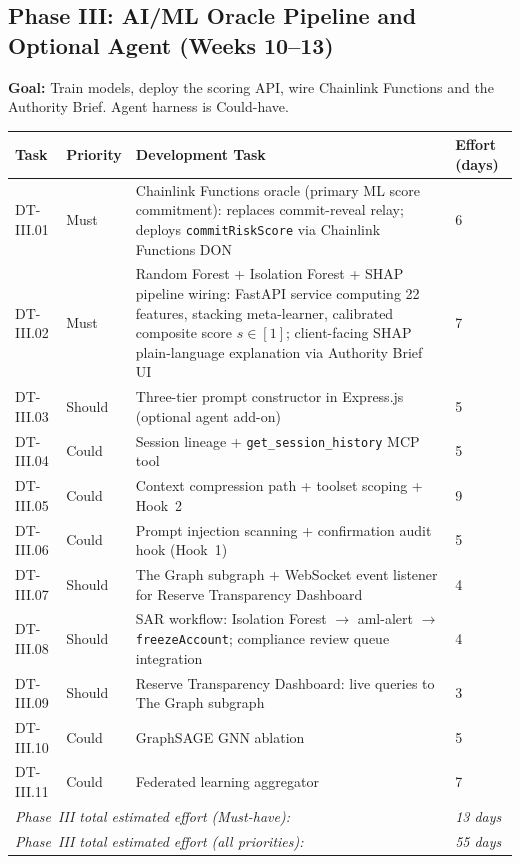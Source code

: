 \documentclass[12pt, a4paper]{report}
\newcommand{\tableheadcolor}{\rowcolor{TableHeadBg}}
\begin{document}
\vspace{2pt}

\subsection{Phase III: AI/ML Oracle Pipeline and Optional Agent (Weeks 10--13)}

\textbf{Goal:} Train models, deploy the scoring API, wire Chainlink Functions and the Authority Brief. Agent harness is Could-have.

\begin{table}[H]
\centering
\begin{tabular}{p{1.8cm}p{1.8cm}p{7.5cm}p{1.5cm}}
\toprule
\tableheadcolor
\textbf{Task} & \textbf{Priority} & \textbf{Development Task} & \textbf{Effort (days)} \\
\midrule
DT-III.01 & Must & Chainlink Functions oracle (primary ML score commitment): replaces commit-reveal relay; deploys \texttt{commitRiskScore} via Chainlink Functions DON & 6 \\
DT-III.02 & Must & Random Forest + Isolation Forest + SHAP pipeline wiring: FastAPI service computing 22 features, stacking meta-learner, calibrated composite score $s \in [1]$; client-facing SHAP plain-language explanation via Authority Brief UI & 7 \\
DT-III.03 & Should & Three-tier prompt constructor in Express.js (optional agent add-on) & 5 \\
DT-III.04 & Could & Session lineage + \texttt{get\_session\_history} MCP tool & 5 \\
DT-III.05 & Could & Context compression path + toolset scoping + Hook~2 & 9 \\
DT-III.06 & Could & Prompt injection scanning + confirmation audit hook (Hook~1) & 5 \\
DT-III.07 & Should & The Graph subgraph + WebSocket event listener for Reserve Transparency Dashboard & 4 \\
DT-III.08 & Should & SAR workflow: Isolation Forest $\to$ aml-alert $\to$ \texttt{freezeAccount}; compliance review queue integration & 4 \\
DT-III.09 & Should & Reserve Transparency Dashboard: live queries to The Graph subgraph & 3 \\
DT-III.10 & Could & GraphSAGE GNN ablation & 5 \\
DT-III.11 & Could & Federated learning aggregator & 7 \\
\multicolumn{3}{l}{\textit{Phase~III total estimated effort (Must-have):}} & \textit{13 days} \\
\multicolumn{3}{l}{\textit{Phase~III total estimated effort (all priorities):}} & \textit{55 days} \\
\bottomrule
\end{tabular}
\end{table}
\end{document}
